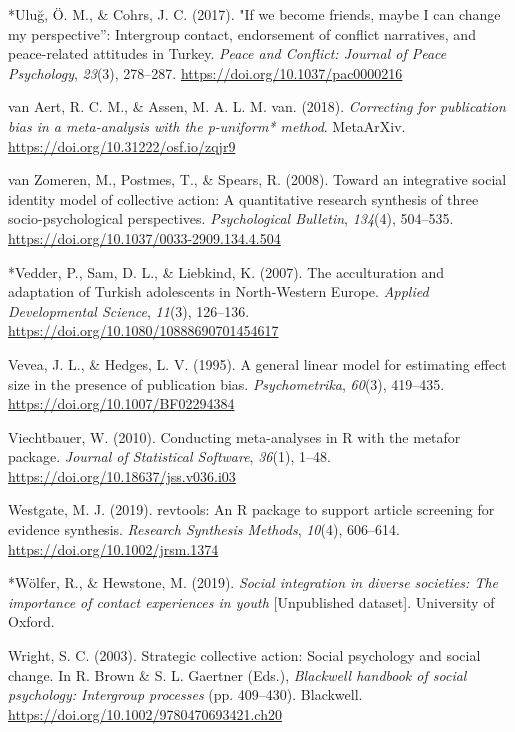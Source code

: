 \documentclass[12pt, letterpaper]{article}
\newenvironment{CSLReferences}[2]{}{}
\begin{document}
\begin{CSLReferences}{1}{0}
\leavevmode\hypertarget{ref-286}{}%
*Uluğ, Ö. M., \& Cohrs, J. C. (2017). "{If} we become friends, maybe {I}
can change my perspective'': {Intergroup} contact, endorsement of
conflict narratives, and peace-related attitudes in {Turkey}.
\emph{Peace and Conflict: Journal of Peace Psychology}, \emph{23}(3),
278--287. \url{https://doi.org/10.1037/pac0000216}

\leavevmode\hypertarget{ref-van_aert_correcting_2018}{}%
van Aert, R. C. M., \& Assen, M. A. L. M. van. (2018). \emph{Correcting
for publication bias in a meta-analysis with the p-uniform* method}.
MetaArXiv. \url{https://doi.org/10.31222/osf.io/zqjr9}

\leavevmode\hypertarget{ref-van_zomeren_toward_2008}{}%
van Zomeren, M., Postmes, T., \& Spears, R. (2008). Toward an
integrative social identity model of collective action: {A} quantitative
research synthesis of three socio-psychological perspectives.
\emph{Psychological Bulletin}, \emph{134}(4), 504--535.
\url{https://doi.org/10.1037/0033-2909.134.4.504}

\leavevmode\hypertarget{ref-829}{}%
*Vedder, P., Sam, D. L., \& Liebkind, K. (2007). The acculturation and
adaptation of {Turkish} adolescents in {North-Western Europe}.
\emph{Applied Developmental Science}, \emph{11}(3), 126--136.
\url{https://doi.org/10.1080/10888690701454617}

\leavevmode\hypertarget{ref-vevea_general_1995}{}%
Vevea, J. L., \& Hedges, L. V. (1995). A general linear model for
estimating effect size in the presence of publication bias.
\emph{Psychometrika}, \emph{60}(3), 419--435.
\url{https://doi.org/10.1007/BF02294384}

\leavevmode\hypertarget{ref-viechtbauer_conducting_2010}{}%
Viechtbauer, W. (2010). Conducting meta-analyses in {R} with the metafor
package. \emph{Journal of Statistical Software}, \emph{36}(1), 1--48.
\url{https://doi.org/10.18637/jss.v036.i03}

\leavevmode\hypertarget{ref-westgate_revtools:_2019}{}%
Westgate, M. J. (2019). {revtools}: An {R} package to support article
screening for evidence synthesis. \emph{Research Synthesis Methods},
\emph{10}(4), 606--614. \url{https://doi.org/10.1002/jrsm.1374}

\leavevmode\hypertarget{ref-2383}{}%
*Wölfer, R., \& Hewstone, M. (2019). \emph{Social integration in diverse
societies: The importance of contact experiences in youth}
{[}Unpublished dataset{]}. University of Oxford.

\leavevmode\hypertarget{ref-brown_strategic_2003}{}%
Wright, S. C. (2003). Strategic collective action: Social psychology and
social change. In R. Brown \& S. L. Gaertner (Eds.), \emph{Blackwell
handbook of social psychology: {Intergroup} processes} (pp. 409--430).
Blackwell. \url{https://doi.org/10.1002/9780470693421.ch20}


\end{CSLReferences}
\end{document}
